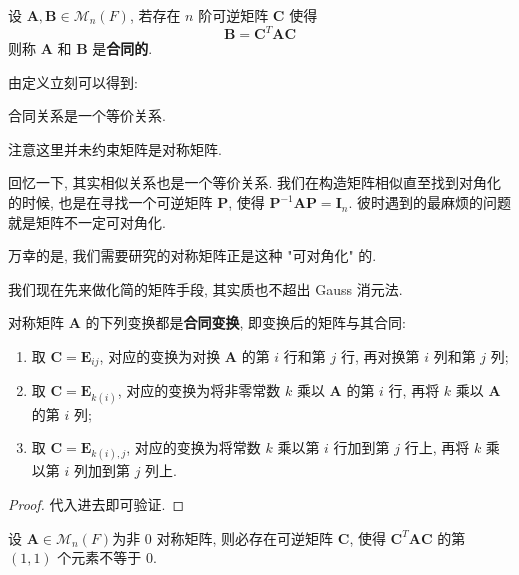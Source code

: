 \documentclass[UTF8]{book}
\begin{document}
\begin{definition} 
    设 $\boldsymbol{A},\boldsymbol{B} \in \mathcal{M}_n(F)$, 
    若存在 $n$ 阶可逆矩阵 $\boldsymbol{C}$ 使得 
    $$ \boldsymbol{B} = \boldsymbol{C}^T\boldsymbol{A}\boldsymbol{C} $$
    则称 $\boldsymbol{A}$ 和 $\boldsymbol{B}$ 是\textbf{合同的}.
\end{definition}

由定义立刻可以得到: 
\begin{proposition}
    合同关系是一个等价关系.
\end{proposition}

注意这里并未约束矩阵是对称矩阵. 

回忆一下, 其实相似关系也是一个等价关系. 
我们在构造矩阵相似直至找到对角化的时候, 也是在寻找一个可逆矩阵 $\boldsymbol{P}$, 
使得 $\boldsymbol{P}^{-1}\boldsymbol{A}\boldsymbol{P} = \boldsymbol{I}_n$. 
彼时遇到的最麻烦的问题就是矩阵不一定可对角化. 

万幸的是, 我们需要研究的对称矩阵正是这种 "可对角化" 的. 

我们现在先来做化简的矩阵手段, 其实质也不超出 Gauss 消元法. 

\begin{lemma}\label{congruence translation}
    对称矩阵 $\boldsymbol{A}$ 的下列变换都是\textbf{合同变换}, 
    即变换后的矩阵与其合同: 
    \begin{enumerate}[(1)]
        \item 取 $\boldsymbol{C} = \boldsymbol{E}_{ij}$, 
        对应的变换为对换 $\boldsymbol{A}$ 的第 $i$ 行和第 $j$ 行, 
        再对换第 $i$ 列和第 $j$ 列; 
        \item 取 $\boldsymbol{C} = \boldsymbol{E}_{k(i)}$, 
        对应的变换为将非零常数 $k$ 乘以 $\boldsymbol{A}$ 的第 $i$ 行, 
        再将 $k$ 乘以 $\boldsymbol{A}$ 的第 $i$ 列; 
        \item 取 $\boldsymbol{C} = \boldsymbol{E}_{k(i),j}$, 
        对应的变换为将常数 $k$ 乘以第 $i$ 行加到第 $j$ 行上, 
        再将 $k$ 乘以第 $i$ 列加到第 $j$ 列上. 
    \end{enumerate}
\end{lemma}

\begin{proof}
    代入进去即可验证. 
\end{proof}

\begin{lemma}
    设 $\boldsymbol{A}\in \mathcal{M}_n(F)$为非 0 对称矩阵, 
    则必存在可逆矩阵 $\boldsymbol{C}$, 使得 
    $\boldsymbol{C}^T\boldsymbol{A}\boldsymbol{C}$ 的第 $(1,1)$ 
    个元素不等于 0. 
\end{lemma}
\end{document}

